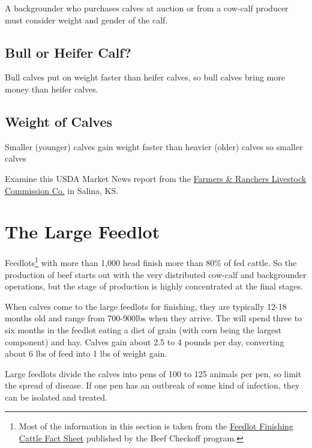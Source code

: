 \documentclass[
  letterpaper,
  DIV=11,
  numbers=noendperiod]{scrreprt}
\begin{document}
A backgrounder who purchases calves at auction or from a cow-calf
producer must consider weight and gender of the calf.

\hypertarget{bull-or-heifer-calf}{%
\subsection{Bull or Heifer Calf?}\label{bull-or-heifer-calf}}

Bull calves put on weight faster than heifer calves, so bull calves
bring more money than heifer calves.

\hypertarget{weight-of-calves}{%
\subsection{Weight of Calves}\label{weight-of-calves}}

Smaller (younger) calves gain weight faster than heavier (older) calves
so smaller calves

Examine this USDA Market News report from the
\href{http://www.ams.usda.gov/mnreports/dc_ls143.txt}{Farmers \&
Ranchers Livestock Commission Co.} in Salina, KS.

\hypertarget{the-large-feedlot}{%
\section{The Large Feedlot}\label{the-large-feedlot}}

Feedlots\footnote{Most of the information in this section is taken from
  the
  \href{http://www.beefusa.org/uDocs/Feedlot\%20finishing\%20fact\%20sheet\%20FINAL_4\%2026\%2006.pdf}{Feedlot
  Finishing Cattle Fact Sheet} published by the Beef Checkoff program.}
with more than 1,000 head finish more than 80\% of fed cattle. So the
production of beef starts out with the very distributed cow-calf and
backgrounder operations, but the stage of production is highly
concentrated at the final stages.

When calves come to the large feedlots for finishing, they are typically
12-18 months old and range from 700-900lbs when they arrive. The will
spend three to six months in the feedlot eating a diet of grain (with
corn being the largest component) and hay. Calves gain about 2.5 to 4
pounds per day, converting about 6 lbs of feed into 1 lbs of weight
gain.

Large feedlots divide the calves into pens of 100 to 125 animals per
pen, so limit the spread of disease. If one pen has an outbreak of some
kind of infection, they can be isolated and treated.
\end{document}
